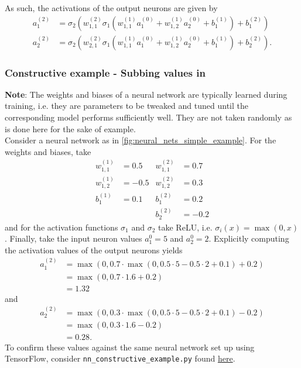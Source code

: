 \documentclass[11pt]{article}
\begin{document}
\noindent As such, the activations of the output neurons are given by
\begin{align*}
    a_1^{(2)}&=\sigma_2\left(w_{1,1}^{(2)}\sigma_1\left(w_{1,1}^{(1)}a_1^{(0)}+w_{1,2}^{(1)}a_2^{(0)}+b_1^{(1)}\right) + b_1^{(2)}\right)\\
    a_2^{(2)}&=\sigma_2\left(w_{2,1}^{(2)}\sigma_1\left(w_{1,1}^{(1)}a_1^{(0)}+w_{1,2}^{(1)}a_2^{(0)}+b_1^{(1)}\right) + b_2^{(2)}\right).
\end{align*}

\subsubsection{Constructive example - Subbing values in}

\noindent\textbf{Note}: The weights and biases of a neural network are typically learned during training, i.e. they are parameters to be tweaked and tuned until the corresponding model performs sufficiently well. They are not taken randomly as is done here for the sake of example.\\

\noindent Consider a neural network as in \autoref{fig:neural_nets_simple_example}. For the weights and biases, take
\begin{align*}
    w_{1,1}^{(1)} & =  0.5 & w_{1,1}^{(2)} &= 0.7 \\
    w_{1,2}^{(1)} & = -0.5 & w_{1,2}^{(2)} &= 0.3 \\
    b_1^{(1)}     & =  0.1 & b_1^{(2)}     & =  0.2 \\
                  &        & b_2^{(2)}     & = -0.2
\end{align*}
and for the activation functions $\sigma_1$ and $\sigma_2$ take ReLU, i.e. $\sigma_i(x)=\max(0, x)$.  Finally, take the input neuron values $a_1^{0}=5$ and $a_2^{0}=2$. Explicitly computing the activation values of the output neurons yields
\begin{align*}
    a_1^{(2)}
    &=
    \max(0, 0.7\cdot\max(0, 0.5\cdot5-0.5\cdot2+0.1)+0.2)\\
    &=
    \max(0, 0.7\cdot1.6+0.2)\\
    &=1.32
\end{align*}
and
\begin{align*}
    a_2^{(2)}
    &=
    \max(0, 0.3\cdot\max(0, 0.5\cdot5-0.5\cdot2+0.1)-0.2)\\
    &=
    \max(0, 0.3\cdot1.6-0.2)\\
    &=0.28.
\end{align*}
To confirm these values against the same neural network set up using TensorFlow, consider \texttt{nn\_constructive\_example.py} found \href{https://gitlab.com/dewibatista/master/-/tree/main/_Done/Personal}{here}.
\end{document}
